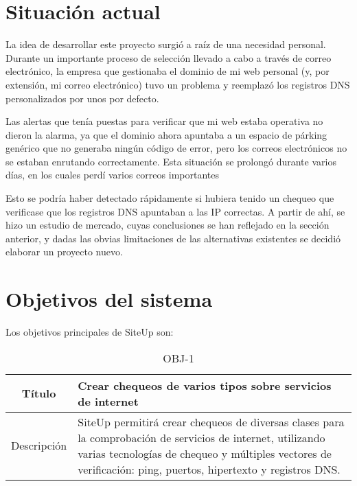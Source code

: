 \section{Situación actual}
\label{sec:situacion-actual}

La idea de desarrollar este proyecto surgió a raíz de una necesidad
personal. Durante un importante proceso de selección llevado a cabo a través de
correo electrónico, la empresa que gestionaba el dominio de mi web personal (y,
por extensión, mi correo electrónico) tuvo un problema y reemplazó los registros
DNS personalizados por unos por defecto. 

Las alertas que tenía puestas para verificar que mi web estaba operativa no
dieron la alarma, ya que el dominio ahora apuntaba a un espacio de párking
genérico que no generaba ningún código de error, pero los correos electrónicos
no se estaban enrutando correctamente. Esta situación se prolongó durante varios
días, en los cuales perdí varios correos importantes

Esto se podría haber detectado rápidamente si hubiera tenido un chequeo que
verificase que los registros DNS apuntaban a las IP correctas. A partir de ahí,
se hizo un estudio de mercado, cuyas conclusiones se han reflejado en la sección
anterior, y dadas las obvias limitaciones de las alternativas existentes se
decidió elaborar un proyecto nuevo.

\section{Objetivos del sistema}

Los objetivos principales de SiteUp son:

\begin{table}[h!]
  \centering
  \begin{tabularx}{\textwidth}{|c|X|}
    \hline
    Título & Crear chequeos de varios tipos sobre servicios de internet \\

    \hline

    Descripción & SiteUp permitirá crear chequeos de diversas clases para la
    comprobación de servicios de internet, utilizando varias tecnologías de
    chequeo y múltiples vectores de verificación: ping, puertos, hipertexto y
    registros DNS. \\    

    \hline
  \end{tabularx}
  \caption{OBJ-1}
\end{table}


